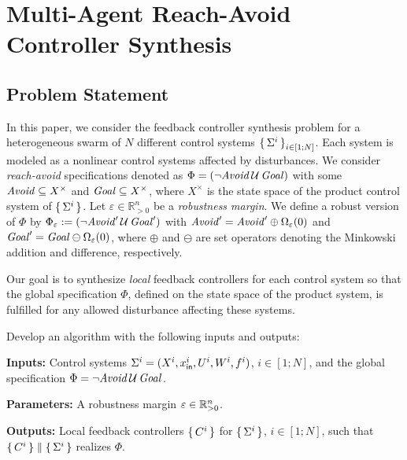 
\section{Multi-Agent Reach-Avoid Controller Synthesis}
\label{sec:problem}

\subsection{Problem Statement}
In this paper, we consider the feedback controller synthesis problem for a heterogeneous swarm of $N$ different control systems $\set{\Sigma^i}_{i\in [1;N]}$.
Each system is modeled as a nonlinear control systems affected by disturbances. We consider \emph{reach-avoid} specifications denoted as $\Phi=(\lnot\mathit{Avoid}\,\mathcal{U}\,\mathit{Goal})$ with some $\mathit{Avoid}\subseteq X^\times$ and $\mathit{Goal}\subseteq X^\times$, where $X^\times$ is the state space of the product control system of $\set{\Sigma^i}$.
Let $\varepsilon\in \mathbb{R}^n_{>0}$ be a \emph{robustness margin}. We define a robust version of $\Phi$ by $\Phi_\varepsilon:=(\lnot\mathit{Avoid}'\,\mathcal{U}\,\mathit{Goal}')$ with $\mathit{Avoid}'=\mathit{Avoid}'\oplus\Omega_\varepsilon(0)$ and $\mathit{Goal}'=\mathit{Goal}\ominus\Omega_\varepsilon(0)$, where $\oplus$ and $\ominus$ are set operators denoting the Minkowski addition and difference, respectively. %

Our goal is to synthesize \emph{local} feedback controllers for each control system so that the global specification $\Phi$, defined on the state space of the product system, is fulfilled for any allowed disturbance affecting these systems.

\begin{resp}
\begin{problem}
\label{problem}
Develop an algorithm with the following inputs and outputs:

\noindent\textbf{Inputs:} Control systems $\Sigma^i=(X^i,x_{\mathsf{in}}^i,U^i,W^i,f^i)$, $i\in [1;N]$, and the global specification $\Phi=\lnot\mathit{Avoid}\,\mathcal{U}\,\mathit{Goal}$.

\noindent\textbf{Parameters:} A robustness margin $\varepsilon\in \mathbb{R}^n_{>0}$.

\noindent\textbf{Outputs:} Local feedback controllers $\set{C^i}$ for $\set{\Sigma^i}$, $i\in [1;N]$, such that $\set{C^i}\parallel \set{\Sigma^i}$ realizes $\Phi$. 
\end{problem}
\end{resp}

